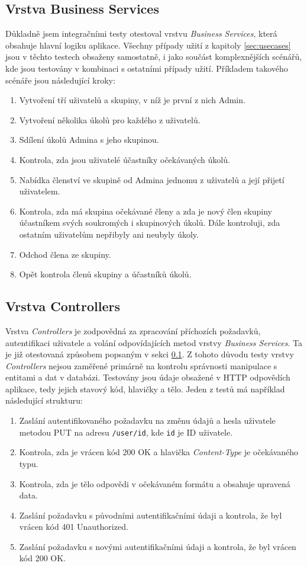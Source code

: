 \documentclass[thesis=B,czech]{FITthesis}[2012/06/26]
\begin{document}
		\subsection{Vrstva Business Services}
			\label{sec:testing-services}
			Důkladně jsem integračními testy otestoval vrstvu \textit{Business Services}, která obsahuje hlavní logiku aplikace. Všechny případy užití z kapitoly \ref{sec:usecases} jsou v těchto testech obsaženy samostatně, i jako součást komplexnějších scénářů, kde jsou testovány v kombinaci s ostatními případy užití. Příkladem takového scénáře jsou následující kroky:
			\begin{enumerate}
				\item Vytvoření tří uživatelů a skupiny, v níž je první z nich Admin.
				\item Vytvoření několika úkolů pro každého z uživatelů.
				\item Sdílení úkolů Admina s jeho skupinou.
				\item Kontrola, zda jsou uživatelé účastníky očekávaných úkolů.
				\item Nabídka členství ve skupině od Admina jednomu z uživatelů a její přijetí uživatelem.
				\item Kontrola, zda má skupina očekávané členy a zda je nový člen skupiny účastníkem svých soukromých i skupinových úkolů. Dále kontroluji, zda ostatním uživatelům nepřibyly ani neubyly úkoly.
				\item Odchod člena ze skupiny.
				\item Opět kontrola členů skupiny a účastníků úkolů.
			\end{enumerate}
		
		\subsection{Vrstva Controllers}
			Vrstva \textit{Controllers} je zodpovědná za zpracování příchozích požadavků, autentifikaci uživatele a volání odpovídajících metod vrstvy \textit{Business Services}. Ta je již otestovaná způsobem popsaným v sekci \ref{sec:testing-services}. Z tohoto důvodu testy vrstvy \textit{Controllers} nejsou zaměřené primárně na kontrolu správnosti manipulace s entitami a dat v databázi. Testovány jsou údaje obsažené v HTTP odpovědích aplikace, tedy jejich stavový kód, hlavičky a tělo. Jeden z testů má například následující strukturu:
			
			\begin{enumerate}
				\item Zaslání autentifikovaného požadavku na změnu údajů a hesla uživatele metodou PUT na adresu \texttt{/user/id}, kde \texttt{id} je ID uživatele.
				\item Kontrola, zda je vrácen kód 200 OK a hlavička \textit{Content-Type} je očekávaného typu.
				\item Kontrola, zda je tělo odpovědi v očekávaném formátu a obsahuje upravená data.
				\item Zaslání požadavku s původními autentifikačními údaji a kontrola, že byl vrácen kód 401 Unauthorized.
				\item Zaslání požadavku s novými autentifikačními údaji a kontrola, že byl vrácen kód 200 OK.
			\end{enumerate}
						
\end{document}
